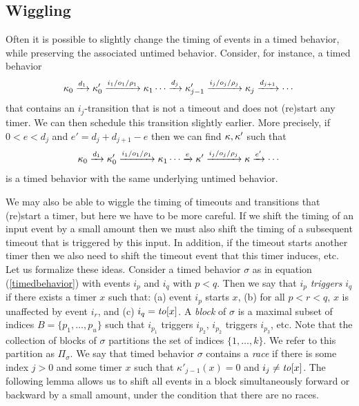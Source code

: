 \subsection{Wiggling}
Often it is possible to slightly change the timing of events in a timed behavior, 
while preserving the associated untimed behavior.
\iflong
Consider, for instance, a timed behavior 
\[
\kappa_0 \xrightarrow{d_1} \kappa'_0 \xrightarrow{i_1/o_1/\rho_1} \kappa_1 \cdots
\xrightarrow{d_j} \kappa'_{j-1} \xrightarrow{i_j/o_j/\rho_j} \kappa_j  \xrightarrow{d_{j+1}} \cdots
\]
that contains an $i_j$-transition that is not a timeout and does not (re)start any timer.
We can then schedule this transition slightly earlier.
More precisely, if $0 < e < d_j$ and $e' = d_j + d_{j+1}- e $ then we can find $\kappa, \kappa'$ such that
\[
\kappa_0 \xrightarrow{d_1} \kappa'_0 \xrightarrow{i_1/o_1/\rho_1} \kappa_1 \cdots
\xrightarrow{e} \kappa' \xrightarrow{i_j/o_j/\rho_j} \kappa  \xrightarrow{e'} \cdots
\]
is a timed behavior with the same underlying untimed behavior.

We may also be able to wiggle the timing of timeouts and transitions that (re)start a timer,
but here we have to be more careful.
\fi
If we shift the timing of an input event by a small amount then we must also shift the timing of a subsequent timeout
that is triggered by this input.
In addition, if the timeout starts another timer then we also need to shift the timeout event that this timer induces, etc.
%
Let us formalize these ideas. Consider a timed behavior $\sigma$ as in equation (\ref{timedbehavior})
with events $i_p$ and $i_q$ with $p < q$.
Then we say that $i_p$ \emph{triggers} $i_q$ if there exists a timer $x$ such that:
(a) event $i_p$ starts $x$, 
(b) for all $p < r < q$, $x$ is unaffected by event $i_r$, and
(c) $i_q = \mathit{to}[x]$.
A \emph{block} of $\sigma$ is a maximal subset of indices $B = \{ p_1 ,\ldots, p_u \}$ such that $i_{p_1}$ triggers $i_{p_2}$, $i_{p_2}$ triggers $i_{p_3}$, etc.
Note that the collection of blocks of $\sigma$ partitions the set of indices $\{ 1 ,\ldots, k \}$.
We refer to this partition as $\Pi_{\sigma}$.
We say that timed behavior $\sigma$ contains a \emph{race} if there is some index $j>0$ and some timer $x$  
such that $\kappa'_{j-1}(x) = 0$ and $i_j \neq \mathit{to}[x]$.
The following lemma allows us to shift all events in a block simultaneously forward or backward by a small amount, 
under the condition that there are no races.

